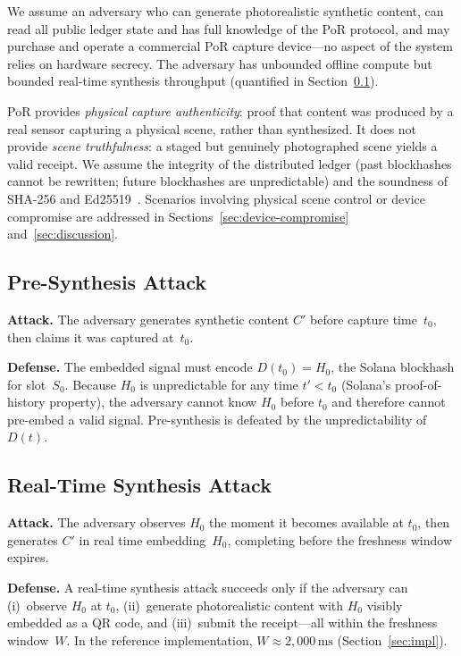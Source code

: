 \documentclass[11pt]{article}
\begin{document}
We assume an adversary who can generate photorealistic synthetic content,
can read all public ledger state and has full knowledge of the PoR protocol,
and may purchase and operate a commercial PoR capture device---no aspect of
the system relies on hardware secrecy. The adversary has unbounded offline
compute but bounded real-time synthesis throughput (quantified in
Section~\ref{sec:presynthesis}).

PoR provides \emph{physical capture authenticity}: proof that content was
produced by a real sensor capturing a physical scene, rather than synthesized.
It does not provide \emph{scene truthfulness}: a staged but genuinely
photographed scene yields a valid receipt. We assume the integrity of the
distributed ledger (past blockhashes cannot be rewritten; future blockhashes
are unpredictable) and the soundness of SHA-256 and Ed25519~\cite{nist-sha}.
Scenarios involving physical scene control or device compromise are addressed
in Sections~\ref{sec:device-compromise} and~\ref{sec:discussion}.

\subsection{Pre-Synthesis Attack}
\label{sec:presynthesis}

\textbf{Attack.} The adversary generates synthetic content $C'$ before capture
time~$t_0$, then claims it was captured at~$t_0$.

\textbf{Defense.} The embedded signal must encode $D(t_0) = H_0$, the Solana
blockhash for slot~$S_0$. Because $H_0$ is unpredictable for any time $t' <
t_0$ (Solana's proof-of-history property), the adversary cannot know $H_0$
before $t_0$ and therefore cannot pre-embed a valid signal. Pre-synthesis is
defeated by the unpredictability of~$D(t)$.

\subsection{Real-Time Synthesis Attack}

\textbf{Attack.} The adversary observes $H_0$ the moment it becomes available
at $t_0$, then generates $C'$ in real time embedding~$H_0$, completing before
the freshness window expires.

\textbf{Defense.} A real-time synthesis attack succeeds only if the adversary
can (i)~observe $H_0$ at $t_0$, (ii)~generate photorealistic content with
$H_0$ visibly embedded as a QR code, and (iii)~submit the receipt---all within
the freshness window~$W$.  In the reference implementation,
$W \approx 2{,}000\,\text{ms}$ (Section~\ref{sec:impl}).
\end{document}
